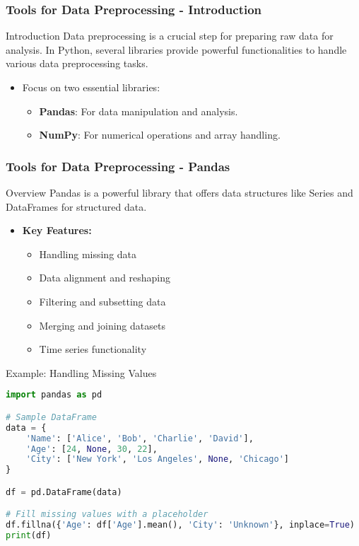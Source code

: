 \documentclass{beamer}
\begin{document}
\begin{frame}[fragile]
    \frametitle{Tools for Data Preprocessing - Introduction}
    \begin{block}{Introduction}
        Data preprocessing is a crucial step for preparing raw data for analysis. In Python, several libraries provide powerful functionalities to handle various data preprocessing tasks.
    \end{block}
    \begin{itemize}
        \item Focus on two essential libraries: 
        \begin{itemize}
            \item \textbf{Pandas}: For data manipulation and analysis.
            \item \textbf{NumPy}: For numerical operations and array handling.
        \end{itemize}
    \end{itemize}
\end{frame}

\begin{frame}[fragile]
    \frametitle{Tools for Data Preprocessing - Pandas}
    \begin{block}{Overview}
        Pandas is a powerful library that offers data structures like Series and DataFrames for structured data.
    \end{block}
    \begin{itemize}
        \item \textbf{Key Features:}
        \begin{itemize}
            \item Handling missing data
            \item Data alignment and reshaping
            \item Filtering and subsetting data
            \item Merging and joining datasets
            \item Time series functionality
        \end{itemize}
    \end{itemize}
    \begin{block}{Example: Handling Missing Values}
        \begin{lstlisting}[language=Python]
import pandas as pd

# Sample DataFrame
data = {
    'Name': ['Alice', 'Bob', 'Charlie', 'David'],
    'Age': [24, None, 30, 22],
    'City': ['New York', 'Los Angeles', None, 'Chicago']
}

df = pd.DataFrame(data)

# Fill missing values with a placeholder
df.fillna({'Age': df['Age'].mean(), 'City': 'Unknown'}, inplace=True)
print(df)
        \end{lstlisting}
    \end{block}
\end{frame}
\end{document}
